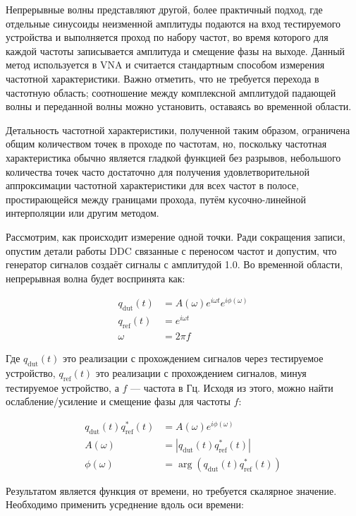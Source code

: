 \documentclass{report}
\begin{document}
Непрерывные волны представляют другой, более практичный подход, где отдельные синусоиды неизменной амплитуды подаются на вход тестируемого устройства и выполняется проход по набору частот, во время которого для каждой частоты записывается амплитуда и смещение фазы на выходе. Данный метод используется в VNA и считается стандартным способом измерения частотной характеристики. Важно отметить, что не требуется перехода в частотную область; соотношение между комплексной амплитудой падающей волны и переданной волны можно установить, оставаясь во временной области.

Детальность частотной характеристики, полученной таким образом, ограничена общим количеством точек в проходе по частотам, но, поскольку частотная характеристика обычно является гладкой функцией без разрывов, небольшого количества точек часто достаточно для получения удовлетворительной аппроксимации частотной характеристики для всех частот в полосе, простирающейся между границами прохода, путём кусочно-линейной интерполяции или другим методом.

Рассмотрим, как происходит измерение одной точки. Ради сокращения записи, опустим  детали работы DDC связанные с переносом частот и допустим, что генератор сигналов создаёт сигналы с амплитудой 1.0. Во временной области, непрерывная волна будет воспринята как:

\begin{align}
q_\text{dut}(t) &= A(\omega) e^{i \omega t} e^{i \phi(\omega) } \\
q_\text{ref}(t) &= e^{i \omega t} \\
\omega &= 2 \pi f
\end{align}

Где $q_\text{dut}(t)$ это реализации с прохождением сигналов через тестируемое устройство, $q_\text{ref}(t)$ это реализации с прохождением сигналов, минуя тестируемое устройство, а $f$ --- частота в Гц. Исходя из этого, можно найти ослабление/усиление и смещение фазы для частоты $f$:

\begin{align}
q_\text{dut}(t) q^*_\text{ref}(t) &= A(\omega) e^{i \phi(\omega) } \\
A(\omega) &= \left| q_\text{dut}(t) q^*_\text{ref}(t) \right| \\
\phi(\omega) &= \arg\left( q_\text{dut}(t) q^*_\text{ref}(t) \right)
\end{align}

Результатом является функция от времени, но требуется скалярное значение. Необходимо применить усреднение вдоль оси времени:
\end{document}
